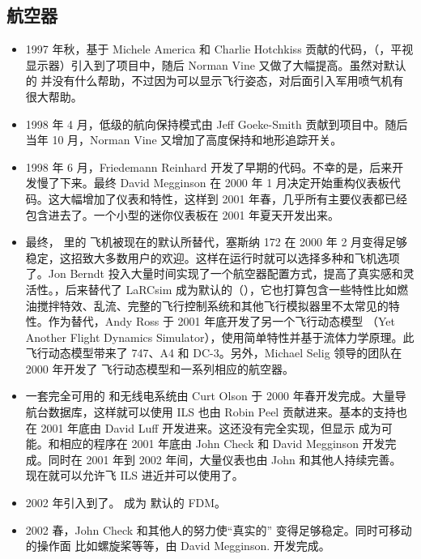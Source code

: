 \ifchinese
\subsection{航空器}
\begin{itemize}
\item 1997 年秋，基于 Michele America 和 Charlie Hotch\-kiss 贡献的代码，（，平视显示器）引入到了项目中，随后 Norman Vine 又做了大幅提高。虽然对默认的 并没有什么帮助，不过因为可以显示飞行姿态，对后面引入军用喷气机有很大帮助。
\item 1998 年 4 月，低级的航向保持模式由 Jeff Goeke-Smith 贡献到项目中。随后当年 10 月，Norman Vine 又增加了高度保持和地形追踪开关。
\item 1998 年 6 月，Friedemann Reinhard  开发了早期的代码。不幸的是，后来开发慢了下来。最终 David Megginson  在 2000 年 1 月决定开始重构仪表板代码。这大幅增加了仪表和特性，这样到 2001 年春，几乎所有主要仪表都已经包含进去了。一个小型的迷你仪表板在 2001 年夏天开发出来。
\item 最终， 里的  飞机被现在的默认所替代，塞斯纳 172 在 2000 年 2 月变得足够稳定，这招致大多数用户的欢迎。这样在运行时就可以选择多种和飞机选项了。Jon Berndt 投入大量时间实现了一个航空器配置方式，提高了真实感和灵活性。\JSBSim，后来替代了 LaRCsim 成为默认的（），它也打算包含一些特性比如燃油搅拌特效、乱流、完整的飞行控制系统和其他飞行模拟器里不太常见的特性。作为替代，Andy Ross 于 2001 年底开发了另一个飞行动态模型 \YASim{}（Yet Another Flight Dynamics Simulator），使用简单特性并基于流体力学原理。此飞行动态模型带来了 747、A4 和 DC-3。另外，Michael Selig 领导的团队在 2000 年开发了  飞行动态模型和一系列相应的航空器。
\item 一套完全可用的  和无线电系统由 Curt Olson 于 2000 年春开发完成。大量导航台数据库，这样就可以使用 ILS 也由 Robin Peel 贡献进来。基本的支持也在 2001 年底由 David Luff 开发进来。这还没有完全实现，但显示 成为可能。和相应的程序在 2001 年底由 John Check 和 David Megginson 开发完成。同时在 2001 年到 2002 年间，大量仪表也由 John 和其他人持续完善。\FlightGear{} 现在就可以允许飞 ILS 进近并可以使用了。
\item 2002 年引入到了\FlightGear{}。\JSBSim{} 成为 \FlightGear{} 默认的 FDM。
\item 2002 春，John Check 和其他人的努力使“真实的” 变得足够稳定。同时可移动的操作面 比如螺旋桨等等，由 David Megginson. 开发完成。

\end{itemize}
